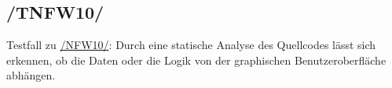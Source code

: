 \subsection*{/TNFW10/}

\label{/TNFW10/} Testfall zu \hyperref[/NFW10/]{/NFW10/}: Durch eine \gls{statische Analyse} des \Gls{Quellcode}s lässt sich erkennen, ob die Daten oder die Logik von der graphischen Benutzeroberfläche abhängen.